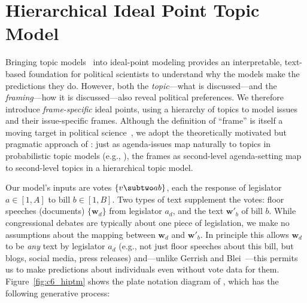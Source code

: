 \section{Hierarchical Ideal Point Topic Model}
\label{sec:c6_model}

Bringing topic models~\cite{blei-09} into ideal-point modeling
provides an interpretable, text-based foundation for political
scientists to understand why the models make the predictions they
do. However, both the \emph{topic}---what is discussed---and the
\emph{framing}---how it is discussed---also reveal political
preferences. We therefore introduce \emph{frame-specific} ideal
points, using a hierarchy of topics to model issues and their
issue-specific frames. Although the definition of ``frame'' is itself
a moving target in political science~\cite{Entman:JC93}, we adopt the
theoretically motivated but pragmatic approach of
: just as agenda-issues map naturally to topics
in probabilistic topic models (e.g., ), the
frames as second-level agenda-setting \cite{McCombs:JS05} map to
second-level topics in a hierarchical topic model.

Our model's inputs are votes $\{v \subtwo ab\}$, each the response of
legislator $a \in [1,A]$ to bill $b \in [1,B]$. Two types of text
supplement the votes: floor speeches (documents) $\{\bm w_d\}$ from
legislator $a_d$, and the text $\bm w'_b$ of bill $b$.  While
congressional debates are typically about one piece of legislation,
we make no assumptions about the mapping between $\bm w_d$ and $\bm
w'_b$. In principle this allows $\bm w_d$ to be \emph{any} text by
legislator $a_d$ (e.g., not just floor speeches about this bill, but
blogs, social media, press releases) and---unlike Gerrish and
Blei~---this permits us to make predictions
about individuals even without vote data for
them. Figure~\ref{fig:c6_hiptm} shows the plate notation diagram of
\name{}, which has the following generative process:


